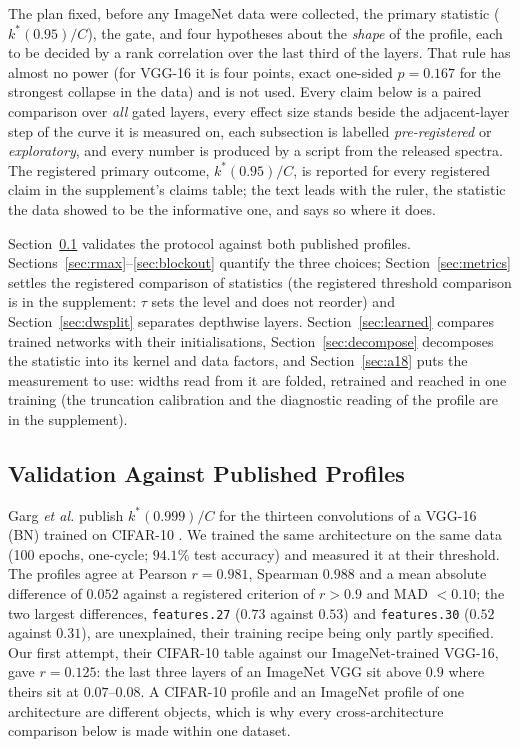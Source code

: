 \documentclass[10pt,journal,compsoc]{IEEEtran}
\begin{document}
The plan fixed, before any ImageNet data were collected, the primary
statistic ($k^*(0.95)/C$), the gate, and four hypotheses about the
\emph{shape} of the profile, each to be decided by a rank correlation over
the last third of the layers. That rule has almost no power (for VGG-16 it
is four points, exact one-sided $p = 0.167$ for the strongest collapse in
the data) and is not used. Every claim below is a paired comparison over
\emph{all} gated layers, every effect size stands beside the adjacent-layer
step of the curve it is measured on, each subsection is labelled
\emph{pre-registered} or \emph{exploratory}, and every number is produced
by a script from the released spectra. The registered primary outcome,
$k^*(0.95)/C$, is reported for every registered claim in the supplement's
claims table; the text leads with the ruler, the statistic the data showed
to be the informative one, and says so where it does.

Section~\ref{sec:repro-garg} validates the protocol against both published profiles. Sections~\ref{sec:rmax}--\ref{sec:blockout} quantify the three choices; Section~\ref{sec:metrics} settles the registered comparison of statistics (the registered threshold comparison is in the supplement: $\tau$ sets the level and does not reorder) and Section~\ref{sec:dwsplit} separates depthwise layers. Section~\ref{sec:learned} compares trained networks with their initialisations, Section~\ref{sec:decompose} decomposes the statistic into its kernel and data factors, and Section~\ref{sec:a18} puts the measurement to use: widths read from it are folded, retrained and reached in one training (the truncation calibration and the diagnostic reading of the profile are in the supplement).

\subsection{Validation Against Published Profiles}
\label{sec:repro-garg}

Garg \emph{et al.} \cite{garg2019lowEffort} publish $k^*(0.999)/C$ for the
thirteen convolutions of a VGG-16 (BN) trained on CIFAR-10
\cite{krizhevsky2009cifar}. We trained the same architecture on the same
data (100 epochs, one-cycle; $94.1\%$ test accuracy) and measured it at
their threshold. The profiles agree at Pearson $r = 0.981$, Spearman
$0.988$ and a mean absolute difference of $0.052$ against a registered
criterion of $r > 0.9$ and MAD $< 0.10$; the two largest differences,
\texttt{features.27} ($0.73$ against $0.53$) and \texttt{features.30}
($0.52$ against $0.31$), are unexplained, their training recipe being
only partly specified. Our first attempt, their CIFAR-10 table against our
ImageNet-trained VGG-16, gave $r = 0.125$: the last three layers of an
ImageNet VGG sit above $0.9$ where theirs sit at $0.07$--$0.08$. A CIFAR-10
profile and an ImageNet profile of one architecture are different objects,
which is why every cross-architecture comparison below is made within one
dataset.
\end{document}
